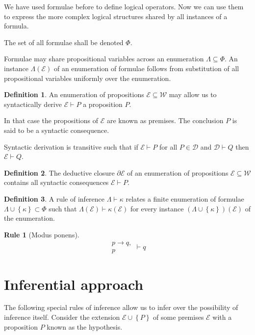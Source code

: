 \documentclass{amsbook}
\newcommand{\setsm}[1]{\left\{#1\right\}}
\newcommand{\infers}{\mathrel\vdash}
\newcommand{\wffs}{\mathcal W}
\theoremstyle{definition}
\newtheorem{frule}{Rule}[section]
\newtheorem{dfn}{Definition}[section]
\begin{document}
We have used formulae before to define logical operators.
Now we can use them to express the more complex logical structures shared by all instances of a formula.

The set of all formulae shall be denoted $\Phi$.

Formulae may share propositional variables across an enumeration $\Lambda \subseteq \Phi$. An instance $\Lambda(\mathcal E)$ of an enumeration of formulae follows from substitution of all propositional variables uniformly over the enumeration.

\begin{dfn}
    An enumeration of propositions $\mathcal E \subseteq \wffs$ may allow us to syntactically derive $\mathcal E \infers P$ a proposition $P$.
\end{dfn}

In that case the propositions of $\mathcal E$ are known as premises. The conclusion $P$ is said to be a syntactic consequence.

Syntactic derivation is transitive such that if $\mathcal E \infers P$ for all $P \in \mathcal D$ and $\mathcal D \infers Q$ then $\mathcal E \infers Q$.

\begin{dfn}
    The deductive closure $\partial \mathcal E$ of an enumeration of propositions $\mathcal E \subseteq \wffs$ contains all syntactic consequences $\mathcal E \infers P$.
\end{dfn}

\begin{dfn}
    A rule of inference $\Lambda \infers \kappa$ relates a finite enumeration of formulae $\Lambda \cup \setsm \kappa \subset \Phi$ such that $\Lambda(\mathcal E) \infers \kappa(\mathcal E)$ for every instance $(\Lambda \cup \setsm \kappa)(\mathcal E)$ of the enumeration.
\end{dfn}

\begin{frule}[Modus ponens]
    $$\begin{aligned}p \rightarrow q, \\ p\end{aligned} \infers q$$
\end{frule}

\section{Inferential approach}

The following special rules of inference allow us to infer over the possibility of inference itself. Consider the extension $\mathcal E \cup\setsm P$ of some premises $\mathcal E$ with a proposition $P$ known as the hypothesis.
\end{document}
